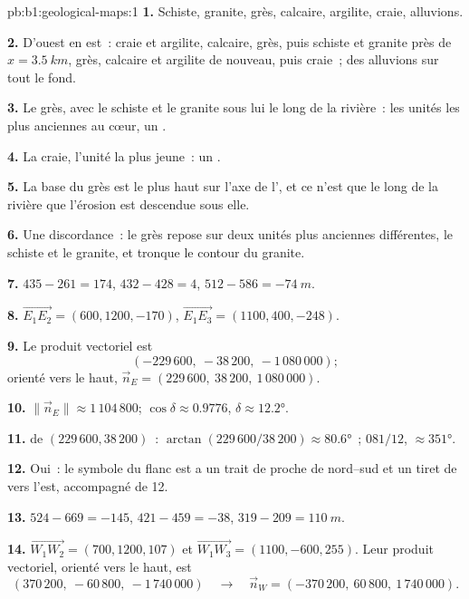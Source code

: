 \begin{solution}{pb:b1:geological-maps:1}
\textbf{1.} Schiste, granite, grès, calcaire, argilite, craie, alluvions.

\textbf{2.} D'ouest en est~: craie et argilite, calcaire, grès, puis schiste et
granite près de $x = \qty{3.5}{km}$, grès, calcaire et argilite de nouveau, puis
craie~; des alluvions sur tout le fond.

\textbf{3.} Le grès, avec le schiste et le granite sous lui le long de la
rivière~: les unités les plus anciennes au cœur, un .

\textbf{4.} La craie, l'unité la plus jeune~: un .

\textbf{5.} La base du grès est le plus haut sur l'axe de l', et ce
n'est que le long de la rivière que l'érosion est descendue sous elle.

\textbf{6.} Une discordance~: le grès repose sur deux unités plus anciennes
différentes, le schiste et le granite, et tronque le contour du granite.

\textbf{7.} $435 - 261 = 174$, $432 - 428 = 4$, $512 - 586 = \qty{-74}{m}$.

\textbf{8.} $\overrightarrow{E_1E_2} = (600, 1200, -170)$,
$\overrightarrow{E_1E_3} = (1100, 400, -248)$.

\textbf{9.} Le produit vectoriel est
\[
  (-229\,600,\ -38\,200,\ -1\,080\,000);
\]
orienté vers le haut, $\vec n_E = (229\,600,\ 38\,200,\ 1\,080\,000)$.

\textbf{10.} $\|\vec n_E\| \approx 1\,104\,800$; $\cos\delta \approx 0.9776$,
$\delta \approx \ang{12.2}$.

\textbf{11.}  de $(229\,600, 38\,200)$~: $\arctan(229\,600/38\,200)
\approx \ang{80.6}$~;  $081/12$,  $\approx \ang{351}$.

\textbf{12.} Oui~: le symbole du flanc est a un trait de  proche de
nord--sud et un tiret de  vers l'est, accompagné de 12.

\textbf{13.} $524 - 669 = -145$, $421 - 459 = -38$, $319 - 209 =
\qty{110}{m}$.

\textbf{14.} $\overrightarrow{W_1W_2} = (700, 1200, 107)$ et
$\overrightarrow{W_1W_3} = (1100, -600, 255)$. Leur produit vectoriel, orienté
vers le haut, est
\[
  (370\,200,\ -60\,800,\ -1\,740\,000) \quad\longrightarrow\quad
  \vec n_W = (-370\,200,\ 60\,800,\ 1\,740\,000).
\]


\end{solution}
